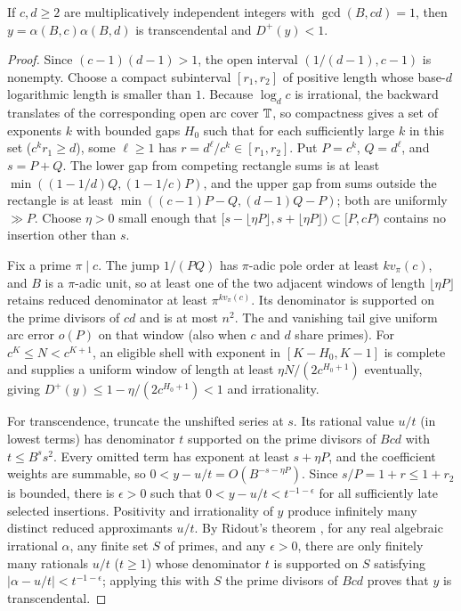 \documentclass[11pt]{article}
\begin{document}
\begin{theorem}\label{th:indep}
If $c,d\ge2$ are multiplicatively independent integers with $\gcd(B,cd)=1$, then $y=\alpha(B,c)\alpha(B,d)$ is transcendental and $D^+(y)<1$.
\end{theorem}
\begin{proof}
Since $(c-1)(d-1)>1$, the open interval $(1/(d-1),c-1)$ is nonempty. Choose a compact subinterval $[r_1,r_2]$ of positive length whose base-$d$ logarithmic length is smaller than $1$. Because $\log_d c$ is irrational, the backward translates of the corresponding open arc cover $\mathbb T$, so compactness gives a set of exponents $k$ with bounded gaps $H_0$ such that for each sufficiently large $k$ in this set ($c^k r_1\ge d$), some $\ell\ge1$ has $r=d^\ell/c^k\in[r_1,r_2]$. Put $P=c^k$, $Q=d^\ell$, and $s=P+Q$. The lower gap from competing rectangle sums is at least $\min((1-1/d)Q,(1-1/c)P)$, and the upper gap from sums outside the rectangle is at least $\min((c-1)P-Q,(d-1)Q-P)$; both are uniformly $\gg P$. Choose $\eta>0$ small enough that $[s-\lfloor\eta P\rfloor,s+\lfloor\eta P\rfloor)\subset[P,cP)$ contains no insertion other than $s$.

Fix a prime $\pi\mid c$. The jump $1/(PQ)$ has $\pi$-adic pole order at least $kv_\pi(c)$, and $B$ is a $\pi$-adic unit, so at least one of the two adjacent windows of length $\lfloor\eta P\rfloor$ retains reduced denominator at least $\pi^{kv_\pi(c)}$. Its denominator is supported on the prime divisors of $cd$ and is at most $n^2$. The  and vanishing tail give uniform arc error $o(P)$ on that window (also when $c$ and $d$ share primes). For $c^K\le N<c^{K+1}$, an eligible shell with exponent in $[K-H_0,K-1]$ is complete and supplies a uniform window of length at least $\eta N/(2c^{H_0+1})$ eventually, giving $D^+(y)\le1-\eta/(2c^{H_0+1})<1$ and irrationality.

For transcendence, truncate the unshifted series at $s$. Its rational value $u/t$ (in lowest terms) has denominator $t$ supported on the prime divisors of $Bcd$ with $t\le B^s s^2$. Every omitted term has exponent at least $s+\eta P$, and the coefficient weights are summable, so $0<y-u/t=O(B^{-s-\eta P})$. Since $s/P=1+r\le1+r_2$ is bounded, there is $\epsilon>0$ such that $0<y-u/t<t^{-1-\epsilon}$ for all sufficiently late selected insertions. Positivity and irrationality of $y$ produce infinitely many distinct reduced approximants $u/t$. By Ridout's theorem \cite{ridout57,ridout}, for any real algebraic irrational $\alpha$, any finite set $S$ of primes, and any $\epsilon>0$, there are only finitely many rationals $u/t$ ($t\ge1$) whose denominator $t$ is supported on $S$ satisfying $|\alpha-u/t|<t^{-1-\epsilon}$; applying this with $S$ the prime divisors of $Bcd$ proves that $y$ is transcendental.
\end{proof}
\end{document}
